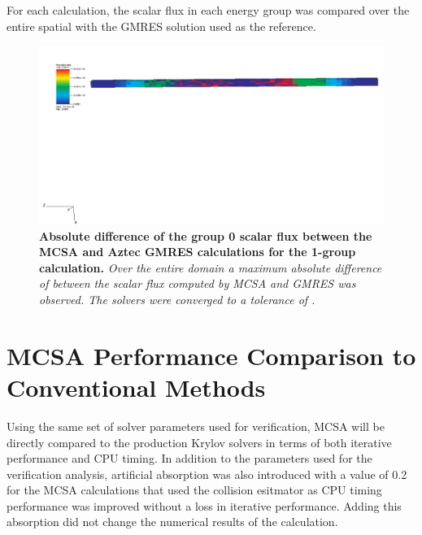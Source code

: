 For each calculation, the scalar flux in each energy group was
compared over the entire spatial with the GMRES solution used as the
reference.

\begin{figure}[t!]
  \begin{center}
    \includegraphics[width=6in]{chapters/spn_equations/gmres_mcsa_1_1_diff.pdf}
  \end{center}
  \caption{\textbf{Absolute difference of the group 0 scalar flux
      between the MCSA and Aztec GMRES calculations for the 1-group
      calculation.} \textit{Over the entire domain a maximum absolute
      difference of  between the scalar flux computed by
      MCSA and GMRES was observed. The solvers were converged to a
      tolerance of .}}
  \label{fig:gmres_mcsa_1_1_diff}
\end{figure}

\section{MCSA Performance Comparison to Conventional Methods}
\label{sec:spn_comparison}
Using the same set of solver parameters used for verification, MCSA
will be directly compared to the production Krylov solvers in terms of
both iterative performance and CPU timing. In addition to the
parameters used for the verification analysis, artificial absorption
was also introduced with a value of 0.2 for the MCSA calculations that
used the collision esitmator as CPU timing performance was improved
without a loss in iterative performance. Adding this absorption did
not change the numerical results of the calculation.

